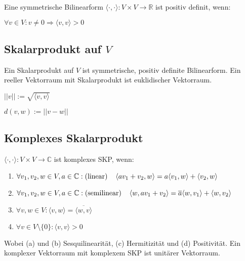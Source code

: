 Eine symmetrische Bilinearform $\langle \cdot, \cdot \rangle : V \times V \rightarrow \mathbb{R}$ ist positiv definit, wenn:

$\forall v \in V: v \neq 0 \Rightarrow \langle v, v \rangle > 0$

\subsection*{Skalarprodukt auf $V$}

Ein Skalarprodukt auf $V$ ist symmetrische, positiv definite Bilinearform. Ein reeller Vektorraum mit Skalarprodukt ist euklidischer Vektorraum.

\begin{description}[leftmargin=!,labelwidth=10mm]
	\item[Norm]   $||v|| := \sqrt{\langle v, v \rangle}$
	\item[Metrik] $d(v, w) := ||v - w||$
\end{description}

\subsection*{Komplexes Skalarprodukt}

$\langle \cdot, \cdot \rangle : V \times V \rightarrow \mathbb{C}$ ist komplexes SKP, wenn:

\begin{enumerate}[label=(\alph*)]
	\item $\forall v_1, v_2, w \in V, a \in \mathbb{C} : \text{(linear)} \\ \hspace*{4mm} \langle av_1 + v_2, w \rangle = a \langle v_1, w \rangle + \langle v_2, w \rangle$
	\item $\forall v_1, v_2, w \in V, a \in \mathbb{C} : \text{(semilinear)} \\ \hspace*{4mm} \langle w, av_1 + v_2 \rangle = \overline a \langle w, v_1 \rangle + \langle w, v_2 \rangle$
	\item $\forall v, w \in V : \langle v, w \rangle = \overline{\langle w, v \rangle}$
	\item $\forall v \in V \setminus \{0\} : \langle v, v \rangle > 0$
\end{enumerate}

Wobei (a) und (b) Sesquilinearität, (c) Hermitizität und (d) Positivität. Ein komplexer Vektorraum mit komplexem SKP ist unitärer Vektorraum.

